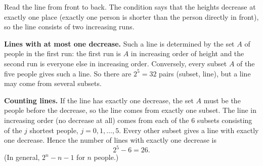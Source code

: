 Read the line from front to back. The condition says that the heights decrease at exactly one place (exactly one person is shorter than the person directly in front), so the line consists of two increasing runs.

\textbf{Lines with at most one decrease.} Such a line is determined by the set $A$ of people in the first run: the first run is $A$ in increasing order of height and the second run is everyone else in increasing order. Conversely, every subset $A$ of the five people gives such a line. So there are $2^5=32$ pairs (subset, line), but a line may come from several subsets.

\textbf{Counting lines.} If the line has exactly one decrease, the set $A$ must be the people before the decrease, so the line comes from exactly one subset. The line in increasing order (no decrease at all) comes from each of the $6$ subsets consisting of the $j$ shortest people, $j=0,1,\dots,5$. Every other subset gives a line with exactly one decrease. Hence the number of lines with exactly one decrease is
\[2^5-6=\boxed{26}.\]
(In general, $2^n-n-1$ for $n$ people.)
